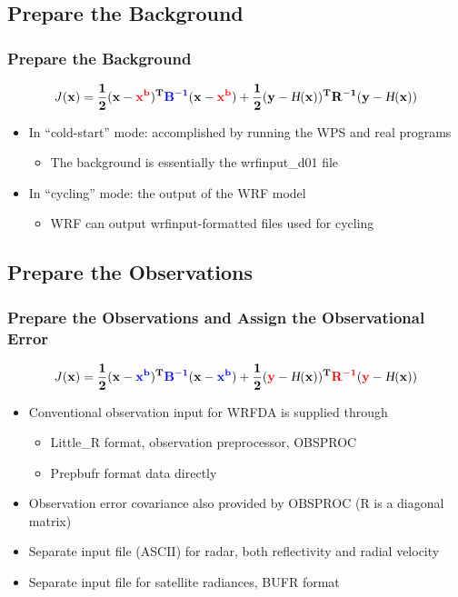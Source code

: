 \documentclass{beamer}
\begin{document}
\subsection{Prepare the Background}
\begin{frame}
\frametitle{Prepare the Background}
\begin{equation*}
J(\bf{x})=\frac{1}{2}(\bf{x}-{\color{red}\bf{x}^b})^T{\color{blue}\bf{B}^{-1}}(\bf{x}-{\color{red}\bf{x}^b})+\frac{1}{2}(\bf{y}-\textsl{H}(\bf{x}))^T\bf{R}^{-1}(\bf{y}-\textsl{H}(\bf{x}))
\end{equation*}
\begin{itemize}
\item In “cold-start” mode: accomplished by running the
WPS and real programs \pause
\begin{itemize}
\item The background is essentially the wrfinput\_d01 file
\end{itemize} \pause
\item In “cycling” mode: the output of the WRF model \pause
\begin{itemize}
\item WRF can output wrfinput-formatted files used for cycling 
\end{itemize}
\end{itemize}
\end{frame}

\subsection{Prepare the Observations}
\begin{frame}
\frametitle{Prepare the Observations and Assign the Observational Error}
\begin{equation*}
J(\bf{x})=\frac{1}{2}(\bf{x}-{\color{blue}\bf{x}^b})^T{\color{blue}\bf{B}^{-1}}(\bf{x}-{\color{blue}\bf{x}^b})+\frac{1}{2}({\color{red}\bf{y}}-\textsl{H}(\bf{x}))^T{\color{red}\bf{R}^{-1}}({\color{red}\bf{y}}-\textsl{H}(\bf{x}))
\end{equation*}
\begin{itemize}
\item Conventional observation input for WRFDA is supplied through \pause
\begin{itemize}
\item Little\_R format, observation preprocessor, OBSPROC \pause
\item  Prepbufr format data directly \pause
\end{itemize} \pause
\item Observation error covariance also provided by OBSPROC (R is a diagonal matrix) \pause
\item \alert{Separate input file (ASCII) for radar, both reflectivity and radial velocity} \pause
\item \alert{Separate input file for satellite radiances, BUFR format} 
\end{itemize}
\end{frame}
\end{document}
